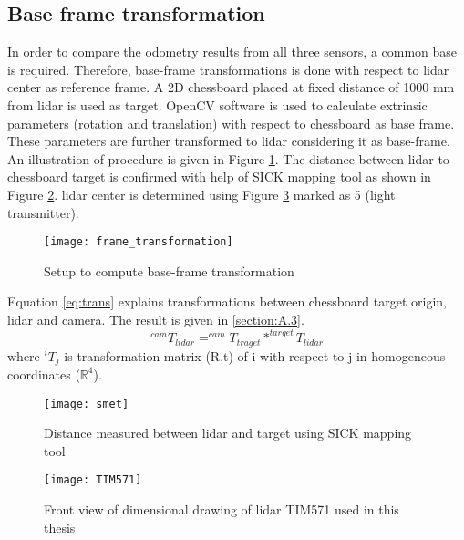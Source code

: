 \subsection{Base frame transformation}
In order to compare the odometry results from all three sensors, a common base is required. Therefore, base-frame transformations is done with respect to \acrshort{lidar} center as reference frame. A 2D chessboard placed at fixed distance of 1000 mm from \acrshort{lidar} is used as target. OpenCV software \cite{opencvcalib} is used to calculate extrinsic parameters (rotation and translation) with respect to chessboard as base frame. These parameters are further transformed to \acrshort{lidar} considering it as base-frame. An illustration of procedure is given in Figure \ref{fig:transformation}. The distance between \acrshort{lidar} to chessboard target is confirmed with help of SICK mapping tool as shown in Figure \ref{fig:smet}. \acrshort{lidar} center is determined using Figure \ref{fig:tim} marked as 5 (light transmitter). \\
\begin{figure}[H]
	\centering
	\texttt{[image: frame\_transformation]}
	\caption{Setup to compute base-frame transformation}
	\label{fig:transformation}
\end{figure}
\noindent Equation \ref{eq:trans} explains transformations between chessboard target origin, \acrshort{lidar} and camera. The result is given in \ref{section:A.3}.\\
\begin{equation*}
\label{eq:trans}
^{cam}T_{lidar}  = ^{cam}T_{traget} * ^{target}T_{lidar} 
\end{equation*} 
\noindent where $ ^{i}T_{j} $ is transformation matrix (R,t) of i with respect to j in homogeneous coordinates ($ \mathbb{R}^{4} $).
\begin{figure}[H]
	\centering
	\texttt{[image: smet]}
	\caption{Distance measured between \acrshort{lidar} and target using SICK mapping tool}
	\label{fig:smet}
\end{figure}
\begin{figure}[H]
	\centering
	\texttt{[image: TIM571]}
	\caption{Front view of dimensional drawing of \acrshort{lidar} TIM571 used in this thesis \cite{sick}}
	\label{fig:tim}
\end{figure}

